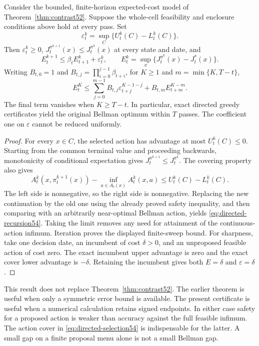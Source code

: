 \begin{theorem}\label{thm:directed54}
Consider the bounded, finite-horizon expected-cost model of Theorem~\ref{thm:contrast52}. Suppose the whole-cell feasibility and enclosure conditions above hold at every pass. Set
\[
 \varepsilon_t^k=\sup_C\{U_t^k(C)-L_t^k(C)\}.
\]
Then $\varepsilon_t^k\ge0$, $J_t^{\pi^{k+1}}(x)\le J_t^{\pi^k}(x)$ at every state and date, and
\begin{equation}\label{eq:directed-recursion54}
 E_t^{k+1}\le\beta_t E_{t+1}^k+\varepsilon_t^k,
 \qquad E_t^k=\sup_x\{J_t^{\pi^k}(x)-J_t^*(x)\}.
\end{equation}
Writing $B_{t,0}=1$ and $B_{t,j}=\prod_{i=0}^{j-1}\beta_{t+i}$, for $K\ge1$ and $m=\min\{K,T-t\}$,
\[
 E_t^K\le\sum_{j=0}^{m-1}B_{t,j}\varepsilon_{t+j}^{K-1-j}
            +B_{t,m}E_{t+m}^{K-m}.
\]
The final term vanishes when $K\ge T-t$. In particular, exact directed greedy certificates yield the original Bellman optimum within $T$ passes. The coefficient one on $\varepsilon$ cannot be reduced uniformly.
\end{theorem}

\begin{proof}
For every $x\in C$, the selected action has advantage at most $U_t^k(C)\le0$. Starting from the common terminal value and proceeding backwards, monotonicity of conditional expectation gives $J_t^{\pi^{k+1}}\le J_t^{\pi^k}$. The covering property also gives
\[
 A_t^k(x,\pi_t^{k+1}(x))-\inf_{a\in A_t(x)}A_t^k(x,a)
       \le U_t^k(C)-L_t^k(C).
\]
The left side is nonnegative, so the right side is nonnegative. Replacing the new continuation by the old one using the already proved safety inequality, and then comparing with an arbitrarily near-optimal Bellman action, yields \eqref{eq:directed-recursion54}. Taking the limit removes any need for attainment of the continuous-action infimum. Iteration proves the displayed finite-sweep bound. For sharpness, take one decision date, an incumbent of cost $\delta>0$, and an unproposed feasible action of cost zero. The exact incumbent upper advantage is zero and the exact cover lower advantage is $-\delta$. Retaining the incumbent gives both $E=\delta$ and $\varepsilon=\delta$.
\end{proof}

This result does not replace Theorem~\ref{thm:contrast52}. The earlier theorem is useful when only a symmetric error bound is available. The present certificate is useful when a numerical calculation retains signed endpoints. In either case safety for a proposed action is weaker than accuracy against the full feasible infimum. The action cover in \eqref{eq:directed-selection54} is indispensable for the latter. A small gap on a finite proposal menu alone is not a small Bellman gap.

